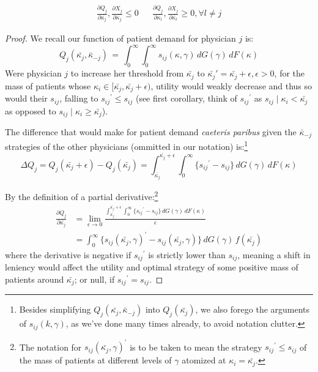 \documentclass[../main.tex]{subfiles}
\begin{document}
\begin{prop}
\begin{align*}
    \frac{\partial Q_{j}}{\partial\bar{\kappa_{j}}},\frac{\partial X_{j}}{\partial\bar{\kappa_{j}}} \leq 0 &&  \frac{\partial Q_{j}}{\partial\bar{\kappa_{l}}}, \frac{\partial X_{j}}{\partial\bar{\kappa_{l}}} \geq 0, \forall l \neq j
\end{align*}
\end{prop}

\begin{proof}
We recall our function of patient demand for physician $j$ is:
    \[
    Q_j(\bar{\kappa_j}, \bar{\kappa}_{-j}) \,=\, \int_{0}^{\infty} \int_{0}^{\infty} s_{ij} (\kappa, \gamma) \,dG(\gamma) \,dF(\kappa) 
    \]
Were physician $j$ to increase her threshold from $\bar{\kappa_j}$ to $\bar{\kappa_j}' = \bar{\kappa_j} + \epsilon, \epsilon > 0$, for the mass of patients whose $\kappa_i \in [\bar{\kappa_j}, \bar{\kappa_j} + \epsilon)$, utility would weakly decrease and thus so would their $s_{ij}$, falling to ${s_{ij}}^{\prime} \leq s_{ij}$ (see first corollary, think of ${s_{ij}}^{\prime}$ as $s_{ij} \mid \kappa_i < \bar{\kappa_j}$ as opposed to $s_{ij} \mid \kappa_i \geq \bar{\kappa_j}$).

The difference that would make for patient demand \textit{caeteris paribus} given the $\bar{\kappa}_{-j}$ strategies of the other physicians (ommitted in our notation) is:\footnote{Besides simplifying $Q_j(\bar{\kappa_j}, \bar{\kappa}_{-j})$ into $Q_j(\bar{\kappa_j})$, we also forego the arguments of $s_{ij} (k, \gamma)$, as we've done many times already, to avoid notation clutter. }
\[
\Delta Q_j = Q_j(\bar{\kappa_j} + \epsilon) - Q_j(\bar{\kappa_j})=\int_{\bar{\kappa_j}}^{\bar{\kappa_j} + \epsilon} \int_{0}^{\infty} \{ {s_{ij}}^{\prime} - s_{ij}\} \,dG(\gamma) \,dF(\kappa)
\]

By the definition of a partial derivative:\footnote{The notation for ${s_{ij}} (\bar{\kappa_j}, \gamma)^{\prime}$ is to be taken to mean the strategy ${s_{ij}}^{\prime} \leq s_{ij}$ of the mass of patients at different levels of $\gamma$ atomized at $\kappa_i = \bar{\kappa_j}$.}
\begin{align*}
    \frac{\partial Q_{j}}{\partial\bar{\kappa_{j}}} & = \lim_{\epsilon \rightarrow 0} \frac{\int_{\bar{\kappa_j}}^{\bar{\kappa_j} + \epsilon} \int_{0}^{\infty} \{ {s_{ij}}^{\prime} - s_{ij}\} \,dG(\gamma) \,dF(\kappa)}{\epsilon} \\
    & = \int_{0}^{\infty} \{ {s_{ij}} (\bar{\kappa_j}, \gamma)^{\prime} - s_{ij} (\bar{\kappa_j}, \gamma)\} \,dG(\gamma) \,f(\bar{\kappa_j}) 
\end{align*}
where the derivative is negative if ${s_{ij}}^{\prime}$ is strictly lower than $s_{ij}$, meaning a shift in leniency would affect the utility and optimal strategy of some positive mass of patients around $\bar{\kappa_j}$; or null, if ${s_{ij}}^{\prime} = s_{ij}$.


\end{proof}
\end{document}

